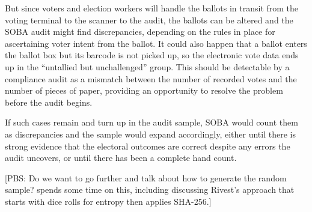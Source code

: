 But since voters and election workers will handle the ballots in transit from the voting terminal 
to the scanner to the audit, the ballots can be altered and the SOBA audit might find discrepancies,
depending on the rules in place for ascertaining voter intent from the ballot.
It could also happen that a ballot enters the ballot box but its barcode is not
picked up, so the electronic vote data ends up in the ``untallied but unchallenged'' group.
This should be detectable by a compliance audit \cite{benalohEtal11,lindemanStark12,starkWagner12} 
as a mismatch between the number of recorded votes and the number of pieces of paper,
providing an opportunity to resolve the problem before the audit begins.

If such cases remain and turn up in the audit sample, SOBA would count them as discrepancies 
and the sample would expand accordingly, either
until there is strong evidence that the electoral outcomes are correct despite any errors the audit
uncovers, or until there has been a complete hand count.

[PBS:  Do we want to go further and talk about how to generate the random sample?  \cite{lindemanStark12}
spends some time on this, including discussing Rivest's approach that starts with dice rolls for entropy then
applies SHA-256.]

